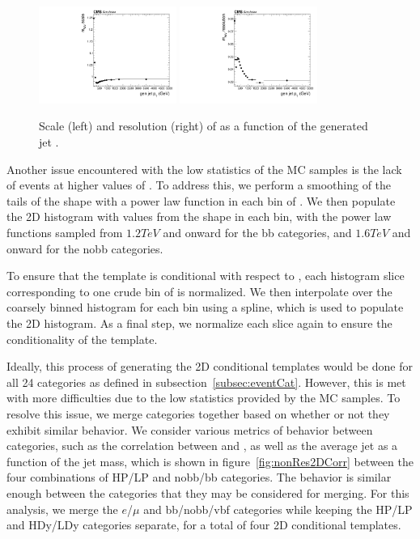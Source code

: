 \begin{figure}[htbp]
  \centering
  \includegraphics[width=0.4\textwidth]{fig/analysis/detectorParam_nonRes_scale_MVV.pdf}
  \includegraphics[width=0.4\textwidth]{fig/analysis/detectorParam_nonRes_resolution_MVV.pdf}
  \caption{
    Scale (left) and resolution (right) of \MVV as a function of the generated jet \pt.
  }
  \label{fig:nonResScaleResMVV}
\end{figure}

Another issue encountered with the low statistics of the MC samples is the lack of events at higher values of \MVV.
To address this, we perform a smoothing of the tails of the \MVV shape with a power law function in each bin of \MJ.
We then populate the 2D histogram with values from the \MVV shape in each \MJ bin, with the power law functions sampled from $1.2\unit{TeV}$ and onward for the bb categories, and $1.6\unit{TeV}$ and onward for the nobb categories.

To ensure that the template is conditional with respect to \MJ, each histogram slice corresponding to one crude bin of \MJ is normalized.
We then interpolate over the coarsely binned \MJ histogram for each \MVV bin using a spline, which is used to populate the 2D histogram.
As a final step, we normalize each \MJ slice again to ensure the conditionality of the template.

Ideally, this process of generating the 2D conditional templates would be done for all 24 categories as defined in subsection~\ref{subsec:eventCat}.
However, this is met with more difficulties due to the low statistics provided by the MC samples.
To resolve this issue, we merge categories together based on whether or not they exhibit similar behavior.
We consider various metrics of behavior between categories, such as the correlation between \MJ and \MVV, as well as the average jet \pt as a function of the jet mass, which is shown in figure~\ref{fig:nonRes2DCorr} between the four combinations of HP/LP and nobb/bb categories.
The behavior is similar enough between the categories that they may be considered for merging.
For this analysis, we merge the $e$/$\mu$ and bb/nobb/vbf categories while keeping the HP/LP and HDy/LDy categories separate, for a total of four 2D conditional templates.

